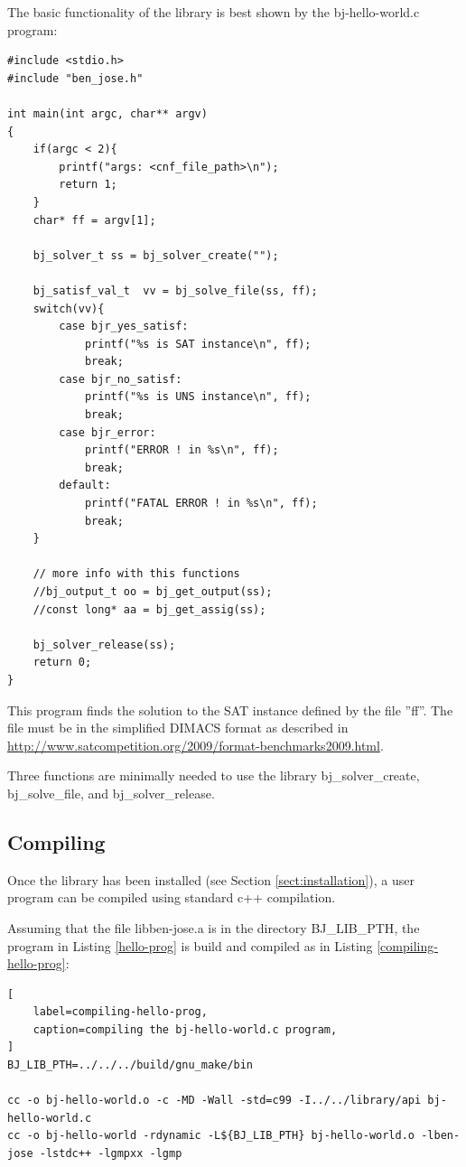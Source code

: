 \documentclass{easychair}
\newcommand{\bjsolvercreate}{bj\_solver\_create}
\newcommand{\bjsolvefile}{bj\_solve\_file}
\newcommand{\bjsolverrelease}{bj\_solver\_release}
\newcommand{\BJLIBPTH}{BJ\_LIB\_PTH}
\begin{document}
The basic functionality of the library is best shown by the bj-hello-world.c program:

\begin{lstlisting}[label=hello-prog, caption=bj-hello-world.c program,]
#include <stdio.h>
#include "ben_jose.h"

int main(int argc, char** argv)
{
	if(argc < 2){
		printf("args: <cnf_file_path>\n");
		return 1;
	}
	char* ff = argv[1];
	
	bj_solver_t ss = bj_solver_create("");
	
	bj_satisf_val_t  vv = bj_solve_file(ss, ff);
	switch(vv){
		case bjr_yes_satisf:
			printf("%s is SAT instance\n", ff);
			break;
		case bjr_no_satisf:
			printf("%s is UNS instance\n", ff);
			break;
		case bjr_error:
			printf("ERROR ! in %s\n", ff);
			break;
		default:
			printf("FATAL ERROR ! in %s\n", ff);
			break;
	}
	
	// more info with this functions
	//bj_output_t oo = bj_get_output(ss);
	//const long* aa = bj_get_assig(ss);
	
	bj_solver_release(ss);
	return 0;
}
\end{lstlisting}

This program finds the solution to the SAT instance defined by the file ''ff''. The file must be in the simplified DIMACS format as described in \url{http://www.satcompetition.org/2009/format-benchmarks2009.html}.

Three functions are minimally needed to use the library \bjsolvercreate, \bjsolvefile, and \bjsolverrelease.

\subsection{Compiling}
\label{sect:dimacs}

Once the library has been installed (see Section \ref{sect:installation}), a user program can be compiled using standard c++ compilation.

Assuming that the file libben-jose.a is in the directory {\BJLIBPTH}, the program in Listing \ref{hello-prog} is build and compiled as in Listing \ref{compiling-hello-prog}:

\begin{lstlisting}[
	label=compiling-hello-prog, 
	caption=compiling the bj-hello-world.c program,
]
BJ_LIB_PTH=../../../build/gnu_make/bin

cc -o bj-hello-world.o -c -MD -Wall -std=c99 -I../../library/api bj-hello-world.c
cc -o bj-hello-world -rdynamic -L${BJ_LIB_PTH} bj-hello-world.o -lben-jose -lstdc++ -lgmpxx -lgmp
\end{lstlisting}
\end{document}
